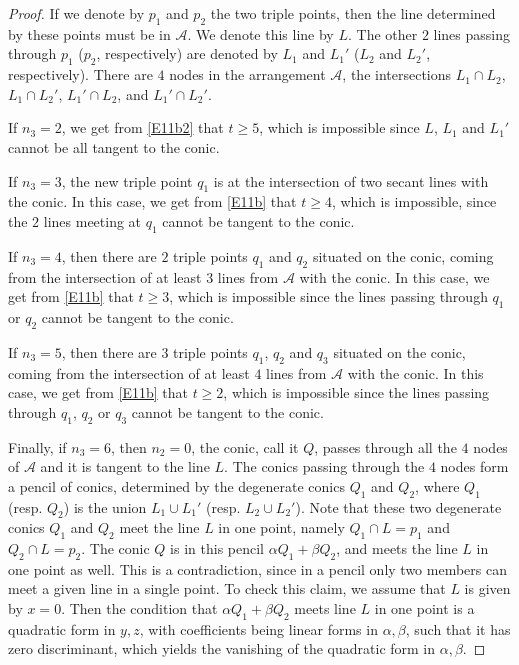 \documentclass[10pt,a4paper]{amsart}
\newcommand{\al}{{\alpha}}
\newcommand{\be}{{\beta}}
\begin{document}
\begin{proof}
\medskip

If we denote by $p_1$ and $p_2$ the two triple points, then the line determined by these points must be in $\mathcal{A}$. We denote this line by $L$. The other $2$ lines passing through $p_1$ ($p_2$, respectively) are denoted by $L_1$ and $L_1'$ ($L_2$ and $L_2'$, respectively). There are $4$ nodes in the arrangement $\mathcal{A}$, the intersections $L_1 \cap L_2$, $L_1 \cap L_2'$,
$L_1' \cap L_2$, and $L_1' \cap L_2'$.

If $n_3=2$, we get from \eqref{E11b2} that $t \geq 5$, which is impossible since $L$, $L_1$ and $L_1'$ cannot be all tangent to the conic.

If $n_3=3$, the new triple point $q_1$ is at the intersection of two secant lines with the conic. In this case, we get from \eqref{E11b} that $t \geq 4$, which is impossible, since the $2$ lines meeting at $q_1$ cannot be tangent to the conic.

If $n_3=4$, then there are $2$ triple points $q_1$ and $q_2$ situated on the conic, coming from the intersection of at least $3$ lines from $\mathcal{A}$ with the conic. In this case, we get from \eqref{E11b} that $t \geq 3$, which is impossible since the lines passing through $q_1$ or $q_2$ cannot be tangent to the conic.

If $n_3=5$, then there are $3$ triple points $q_1$, $q_2$ and $q_3$ situated on the conic, coming from the intersection of at least $4$ lines from $\mathcal{A}$ with the conic. In this case, we get from \eqref{E11b} that $t \geq 2$, which is impossible since the lines passing through $q_1$, $q_2$ or $q_3$ cannot be tangent to the conic.

Finally, if $n_3=6$, then $n_2=0$, the conic, call it $Q$, passes through all the $4$ nodes of $\mathcal{A}$ and it is tangent to the line $L$. The conics passing through the $4$ nodes form a pencil of conics, determined by the degenerate conics $Q_1$ and $Q_2$, where $Q_1$ (resp. $Q_2$) is  the union $L_1 \cup L_1'$ (resp. $L_2 \cup L_2'$).
Note that these two degenerate conics $Q_1$ and $Q_2$ meet the line $L$ in one point, namely $Q_1\cap L=p_1$ and $Q_2\cap L=p_2$.
The conic $Q$ is in this pencil $\al Q_1 + \be Q_2$, and meets
the line $L$ in one point as well. This is a contradiction, since in a pencil only two members can meet a given line in a single point. To check this claim, we assume that $L$ is given by $x=0$. Then the condition that $\al Q_1 + \be Q_2$ meets
line $L$ in one point is a quadratic form in $y,z$, with coefficients being linear forms in $\al, \be$, such that it has zero discriminant, which yields the vanishing of the quadratic form in $\al, \be$.


\end{proof}
\end{document}
